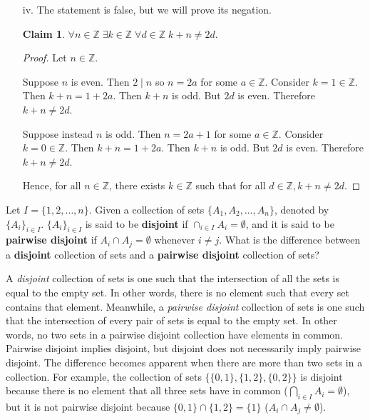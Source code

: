 \documentclass{article}
\newcommand{\Z}{\mathbb{Z}}
\newtheorem*{claim}{Claim}
\theoremstyle{definition}
\begin{document}
\begin{solution}
\begin{enumerate}
\begin{enumerate}
\begin{proof}
        Suppose $n$ is even. Then $2\mid n$, so $n=2d$ for some $d\in\Z$. Consider $k=0\in\Z$. Then $k+n=0+2d=2d$.

        Suppose instead $n$ is odd. Then $n=(2d+1)$ for some $d\in\Z$. Consider $k=(-1)\in\Z$. Then $k+n=(-1)+(2d+1)=2d$.

        Hence, for all $n\in\Z$, there exists $k,d\in\Z$ such that $k+n=2d$.
        \end{proof}
        \item[iv.] The statement is false, but we will prove its negation.
        \begin{claim}
        $\forall n\in\Z\;\exists k\in\Z\;\forall d\in\Z\;k+n\neq 2d.$
        \end{claim}
        \begin{proof}
        Let $n\in\Z$.
        
        Suppose $n$ is even. Then $2\mid n$ so $n=2a$ for some $a\in\Z$. Consider $k=1\in\Z$. Then $k+n=1+2a$. Then $k+n$ is odd. But $2d$ is even. Therefore $k+n\neq 2d$.
        
        Suppose instead $n$ is odd. Then $n=2a+1$ for some $a\in\Z$. Consider $k=0\in\Z$. Then $k+n=1+2a$. Then $k+n$ is odd. But $2d$ is even. Therefore $k+n\neq 2d$.
        
        Hence, for all $n\in\Z$, there exists $k\in\Z$ such that for all $d\in\Z, k+n\neq 2d$.
        \end{proof}
    \end{enumerate}
\end{enumerate}
\end{solution}
\begin{question}
   Let $I=\{1, 2, \dots, n\}$. Given a collection of sets $\{A_1,A_2,\dots, A_n\}$, denoted by $\{A_i\}_{i\in I}$. $\{A_i\}_{i\in I}$ is said to be \textbf{disjoint} if $\cap_{i\in I}A_i=\emptyset$, and it is said to be \textbf{pairwise disjoint} if $A_i\cap A_j=\emptyset$ whenever $i\neq j$. What is the difference between a \textbf{disjoint} collection of sets and a \textbf{pairwise disjoint} collection of sets?
\end{question}
\begin{solution}
A \textit{disjoint} collection of sets is one such that the intersection of all the sets is equal to the empty set. In other words, there is no element such that every set contains that element. Meanwhile, a \textit{pairwise disjoint} collection of sets is one such that the intersection of every pair of sets is equal to the empty set. In other words, no two sets in a pairwise disjoint collection have elements in common. Pairwise disjoint implies disjoint, but disjoint does not necessarily imply pairwise disjoint. The difference becomes apparent when there are more than two sets in a collection. For example, the collection of sets $\{\{0,1\},\{1,2\},\{0,2\}\}$ is disjoint because there is no element that all three sets have in common ($\bigcap_{i\in I}{A_i}=\emptyset$), but it is not pairwise disjoint because $\{0,1\}\cap\{1,2\}=\{1\}$ ($A_i\cap A_j\neq\emptyset$).
\end{solution}
\end{document}
